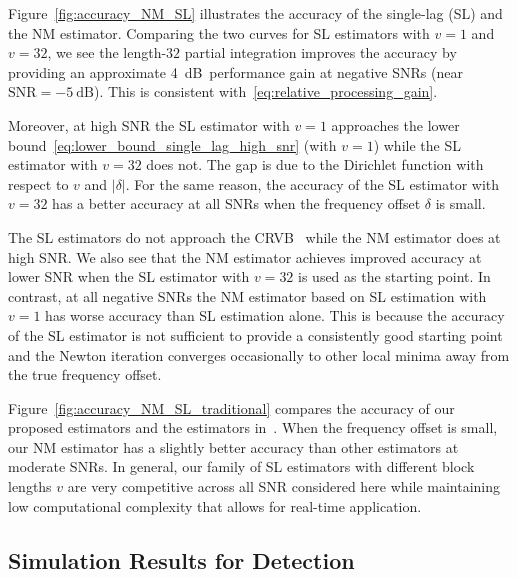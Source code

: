 Figure~\ref{fig:accuracy_NM_SL} illustrates the accuracy of the single-lag (SL) and the NM estimator.
Comparing the two curves for SL estimators with $v{=}1$ and $v=32$, 
we see the length-$32$ partial integration
improves the accuracy by providing an approximate
\SI{4}{\dB}~performance gain at negative SNRs
(near $\text{SNR}=\SI{-5}{\dB}$). This is consistent
with~\eqref{eq:relative_processing_gain}.

Moreover, at high SNR the SL estimator with $v{=}1$ approaches
the lower bound~\eqref{eq:lower_bound_single_lag_high_snr} (with $v=1$)
while the SL estimator with $v=32$ does not. 
The gap is due to the Dirichlet function 
with respect to $v$ and $|\delta|$.
For the same reason, the accuracy of the SL estimator with $v=32$ has
a better accuracy at all SNRs when the frequency offset $\delta$ is small.

The SL estimators do not approach the CRVB~\cite{Gini_98} while the NM
estimator does at high SNR. 
We also see that the NM estimator achieves improved accuracy at lower SNR
when the SL estimator with $v=32$ is used as the starting point. 
In contrast, at all negative SNRs the NM estimator based on SL estimation with $v=1$ has
worse accuracy than SL estimation alone.
This is because the accuracy of the SL estimator is not sufficient to
provide a consistently good starting point and the Newton iteration converges occasionally to 
other local minima away from the true frequency offset.

Figure~\ref{fig:accuracy_NM_SL_traditional} compares the accuracy of our proposed estimators
and the estimators in~\cite{kay_89,Fitz_94,Luise_Reggiannini_95}.
When the 
frequency offset is small, our NM estimator has a slightly better accuracy than other estimators at moderate SNRs.
In general, our family of  SL estimators with different block lengths $v$
are very competitive across all SNR considered here while maintaining
low computational complexity that allows for real-time application.

\subsection{Simulation Results for Detection}


